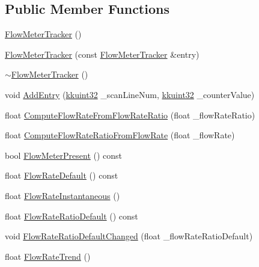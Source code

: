 \subsection*{Public Member Functions}
\begin{DoxyCompactItemize}
\item 
\hyperlink{class_k_k_l_s_c_1_1_flow_meter_tracker_ac01ccbd7718941c3a821e499b0e4bba2}{Flow\+Meter\+Tracker} ()
\item 
\hyperlink{class_k_k_l_s_c_1_1_flow_meter_tracker_ae9571fdcfec50a23611ed0e29842a725}{Flow\+Meter\+Tracker} (const \hyperlink{class_k_k_l_s_c_1_1_flow_meter_tracker}{Flow\+Meter\+Tracker} \&entry)
\item 
\hyperlink{class_k_k_l_s_c_1_1_flow_meter_tracker_aa90fc6d963922729eb135aef0302626d}{$\sim$\+Flow\+Meter\+Tracker} ()
\item 
void \hyperlink{class_k_k_l_s_c_1_1_flow_meter_tracker_a85314afe96a7852a3a50017d140ea416}{Add\+Entry} (\hyperlink{namespace_k_k_b_af8d832f05c54994a1cce25bd5743e19a}{kkuint32} \+\_\+scan\+Line\+Num, \hyperlink{namespace_k_k_b_af8d832f05c54994a1cce25bd5743e19a}{kkuint32} \+\_\+counter\+Value)
\item 
float \hyperlink{class_k_k_l_s_c_1_1_flow_meter_tracker_a4fcd14644883c07362cd2d02f57791e9}{Compute\+Flow\+Rate\+From\+Flow\+Rate\+Ratio} (float \+\_\+flow\+Rate\+Ratio)
\item 
float \hyperlink{class_k_k_l_s_c_1_1_flow_meter_tracker_a8283bfd939242a647fc3492bba61627d}{Compute\+Flow\+Rate\+Ratio\+From\+Flow\+Rate} (float \+\_\+flow\+Rate)
\item 
bool \hyperlink{class_k_k_l_s_c_1_1_flow_meter_tracker_aff930f3e77f1d8af7294d27966da81e6}{Flow\+Meter\+Present} () const 
\item 
float \hyperlink{class_k_k_l_s_c_1_1_flow_meter_tracker_a9435248bf01376552b708b4d7547c290}{Flow\+Rate\+Default} () const 
\item 
float \hyperlink{class_k_k_l_s_c_1_1_flow_meter_tracker_a176b1931eddf6ad1683e86f892b5f4a7}{Flow\+Rate\+Instantaneous} ()
\item 
float \hyperlink{class_k_k_l_s_c_1_1_flow_meter_tracker_a92102f7a3e4a3cbb0d39d3e88884adfb}{Flow\+Rate\+Ratio\+Default} () const 
\item 
void \hyperlink{class_k_k_l_s_c_1_1_flow_meter_tracker_a956eb37830d4e2a2992df07325d4455e}{Flow\+Rate\+Ratio\+Default\+Changed} (float \+\_\+flow\+Rate\+Ratio\+Default)
\item 
float \hyperlink{class_k_k_l_s_c_1_1_flow_meter_tracker_aa5fe2f20f364a07e166433a1d7361841}{Flow\+Rate\+Trend} ()

\end{DoxyCompactItemize}
